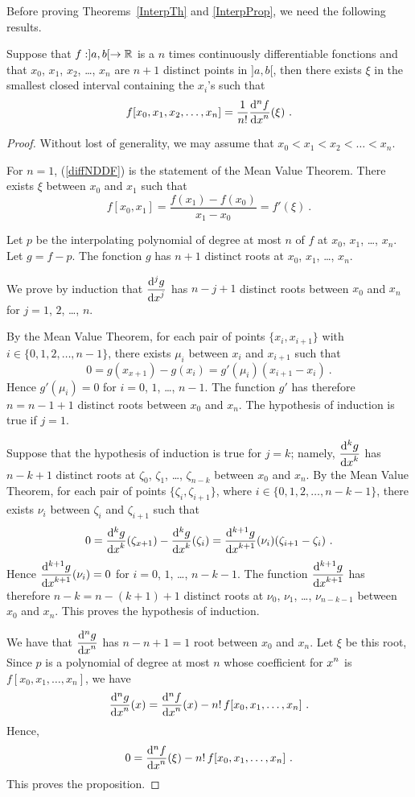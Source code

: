 Before proving Theorems~\ref{InterpTh} and \ref{InterpProp}, we need
the following results.

\begin{prop}
Suppose that $f:]a,b[\rightarrow \mathbb{R}$ is a $n$ times continuously
differentiable fonctions and that $x_0$, $x_1$, $x_2$, \ldots, $x_n$
are $n+1$ distinct points in $]a,b[$, then there exists $\xi$ in the
smallest closed interval containing the $x_i$'s such that
\begin{equation}\label{diffNDDF}
f[x_0,x_1,x_2, \ldots, x_n] = \frac{1}{n!} \dydxn{f}{x}{n}(\xi) \ .
\end{equation}
\label{prop1_NDDF}
\end{prop}

\begin{proof}
Without lost of generality, we may assume that
$x_0 < x_1 < x_2 < \ldots < x_n$.

For $n=1$, (\ref{diffNDDF}) is the statement of the Mean Value
Theorem.  There exists $\xi$ between $x_0$ and $x_1$ such that
\[
f[x_0,x_1] = \frac{f(x_1)-f(x_0)}{x_1-x_0} = f'(\xi) \ .
\]

Let $p$ be the interpolating polynomial of degree at most $n$ of $f$
at $x_0$, $x_1$, \ldots, $x_n$.  Let $g = f - p$.  The fonction $g$
has $n+1$ distinct roots at $x_0$, $x_1$, \ldots, $x_n$.

We prove by induction that $\displaystyle \displaystyle \frac{\mathrm{d}^{j}{g}} {\displaystyle \mathrm{d}{x}^{j}}$
has $n-j+1$ distinct roots between $x_0$ and $x_n$ for $j=1$, $2$,
\ldots, $n$.

By the Mean Value Theorem, for each pair of points
$\{ x_i, x_{i+1}\}$ with $i\in\{0,1,2,\ldots,n-1\}$, there exists
$\mu_i$ between $x_i$ and $x_{i+1}$ such that
\[
0 = g(x_{x+1}) - g(x_i) = g'(\mu_i)(x_{i+1}-x_i) \ .
\]
Hence $g'(\mu_i)=0$ for $i=0$, $1$, \ldots, $n-1$.  The function $g'$
has therefore $n = n-1+1$ distinct roots between $x_0$ and $x_n$.  The
hypothesis of induction is true if $j=1$.

Suppose that the hypothesis of induction is true for $j=k$; namely,
$\displaystyle \displaystyle \frac{\mathrm{d}^{k}{g}} {\displaystyle \mathrm{d}{x}^{k}}$ has $n-k+1$ distinct roots
at $\zeta_0$, $\zeta_1$, \ldots, $\zeta_{n-k}$ between $x_0$ and $x_n$.
By the Mean Value Theorem, for each pair of points
$\{ \zeta_i, \zeta_{i+1}\}$, where $i\in\{0,1,2,\ldots,n-k-1\}$, there
exists $\nu_i$ between $\zeta_i$ and $\zeta_{i+1}$ such that
\[
0 = \displaystyle \frac{\mathrm{d}^{k}{g}} {\displaystyle \mathrm{d}{x}^{k}}(\zeta_{x+1}) - \displaystyle \frac{\mathrm{d}^{k}{g}} {\displaystyle \mathrm{d}{x}^{k}}(\zeta_i)
= \displaystyle \frac{\mathrm{d}^{k+1}{g}} {\displaystyle \mathrm{d}{x}^{k+1}}(\nu_i)(\zeta_{i+1}-\zeta_i) \ .
\]
Hence $\displaystyle \displaystyle \frac{\mathrm{d}^{k+1}{g}} {\displaystyle \mathrm{d}{x}^{k+1}}(\nu_i)=0$ for $i=0$, $1$,
\ldots, $n-k-1$.  The function $\displaystyle \displaystyle \frac{\mathrm{d}^{k+1}{g}} {\displaystyle \mathrm{d}{x}^{k+1}}$ has
therefore $n-k = n-(k+1)+1$ distinct roots at $\nu_0$, $\nu_1$,
\ldots, $\nu_{n-k-1}$ between $x_0$ and $x_n$.  This proves the
hypothesis of induction.

We have that $\displaystyle \displaystyle \frac{\mathrm{d}^{n}{g}} {\displaystyle \mathrm{d}{x}^{n}}$
has $n-n+1 = 1$ root between $x_0$ and $x_n$.  Let $\xi$ be this root,
Since $p$ is a polynomial of degree at most $n$ whose coefficient for
$\displaystyle x^n$ is $f[x_0,x_1,\ldots, x_n]$, we have
\[
\displaystyle \frac{\mathrm{d}^{n}{g}} {\displaystyle \mathrm{d}{x}^{n}}(x) = \displaystyle \frac{\mathrm{d}^{n}{f}} {\displaystyle \mathrm{d}{x}^{n}}(x) - n!\,f[x_0,x_1,\ldots,x_n] \ .
\]
Hence,
\[
0 = \displaystyle \frac{\mathrm{d}^{n}{f}} {\displaystyle \mathrm{d}{x}^{n}}(\xi) - n!\,f[x_0,x_1,\ldots,x_n] \ .
\]
This proves the proposition.
\end{proof}

